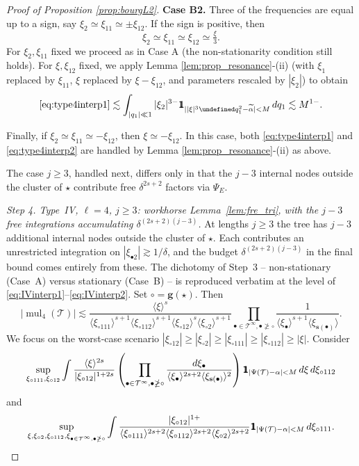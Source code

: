 \documentclass[a4paper,
11pt,  reqno]{amsart}
\newcommand{\mathbbm}[1]{\mathchoice%
    {\hbox{\sffamily 1\kern-.40em 1}}%
    {\hbox{\sffamily 1\kern-.40em 1}}%
    {\hbox{\scriptsize\sffamily 1\kern-.30em 1}}%
    {\hbox{\tiny\sffamily 1\kern-.25em 1}}}%
\newcommand{\jap}[1]{\langle #1 \rangle}
\newcommand{\5}{\textup{V}}
\newcommand{\noi}{\noindent}
\newcommand{\ind}{\mathbbm 1}
\theoremstyle{remark}
\newcommand{\bul}{\bullet}
\let\Re=\undefined\DeclareMathOperator*{\Re}{Re}
\newcommand{\TT}{\mathcal{T}}
\newcommand{\gb}{\mathbf{g}}
\newcommand{\sbf}{\mathbf{s}}
\DeclareMathOperator{\mul}{mul}
\numberwithin{equation}{section}
\numberwithin{theorem}{section}
\begin{document}
\begin{proof}[Proof of Proposition \ref{prop:bourgL2}]
\smallskip
\noi
\textbf{Case B2.} Three of the frequencies are equal up to a sign, say $\xi_2\simeq  \xi_{11} \simeq \pm \xi_{12}$. If the sign is positive, then
$$
\xi_2\simeq \xi_{11}\simeq \xi_{12} \simeq \tfrac{\xi}{3}.
$$
For $\xi_2, \xi_{11}$ fixed we proceed as in Case A (the non-stationarity condition still holds). For $\xi, \xi_{12}$ fixed, we apply Lemma \ref{lem:prop_resonance}-(ii) (with $\xi_1$ replaced by $\xi_{11}$, $\xi$ replaced by $\xi-\xi_{12}$, and parameters rescaled by $|\xi_2|$) to obtain
\begin{align}
\eqref{eq:type4interp1}\lesssim \int_{|q_1|\ll 1} |\xi_2|^{3-}\ind_{||\xi|^3\Re q_1^2 - \widetilde\alpha|<M} \,dq_1 \lesssim M^{1-}.
\end{align}

Finally, if $\xi_2\simeq \xi_{11}\simeq-\xi_{12}$, then $\xi\simeq -\xi_{12}$. In this case, both \eqref{eq:type4interp1} and \eqref{eq:type4interp2} are handled by Lemma \ref{lem:prop_resonance}-(ii) as above.

The case $j\ge 3$, handled next, differs only in that the $j-3$ internal nodes outside the cluster of $\star$ contribute free $\delta^{2s+2}$ factors via $\Psi_E$.

\medskip

\noi \textit{Step 4. Type~IV, $\ell=4$, $j\ge 3$: workhorse Lemma~\ref{lem:fre_tri}, with the $j-3$ free integrations accumulating $\delta^{(2s+2)(j-3)}$.}
At lengths $j\ge 3$ the tree has $j-3$ additional internal nodes outside the cluster of $\star$. Each contributes an unrestricted integration on $|\xi_{\bul 2}|\gtrsim 1/\delta$, and the budget $\delta^{(2s+2)(j-3)}$ in the final bound comes entirely from these. The dichotomy of Step~3 -- non-stationary (Case~A) versus stationary (Case~B) -- is reproduced verbatim at the level of \eqref{eq:IVinterp1}--\eqref{eq:IVinterp2}.
Set $\circ=\gb(\star)$. Then
\begin{equation}\label{eq:typeIVmult}
|\mul_4(\TT)|\lesssim \frac{\jap{\xi}^{s}}{\jap{\xi_{\circ111}}^{s+1}\jap{\xi_{\circ112}}^{s+1}\jap{\xi_{\circ12}}^{s}\jap{\xi_{\circ2}}^{s+1}} \prod_{\bul\in\TT^\infty, \bul\ngeq\circ} \frac{1}{\jap{\xi_\bul}^{s+1}\jap{\xi_{\sbf(\bul)}}}.
\end{equation}
We focus on the worst-case scenario $|\xi_{\circ12}|\ge |\xi_{\circ 2}|\ge |\xi_{\circ 111}| \ge |\xi_{\circ 112}| \ge |\xi|$. Consider
\begin{equation}\label{eq:IVinterp1}
\sup_{\xi_{\circ111}, \xi_{\circ12}}\int \frac{\jap{\xi}^{2s}}{|\xi_{\circ12}|^{1+2s}}\left(\prod_{\bul\in\TT^\infty, \bul\ngeq\circ} \frac{d\xi_\bul}{\jap{\xi_\bul}^{2s+2}\jap{\xi_{\sbf(\bul)}}^2}\right) \ind_{|\Psi(\TT)-\alpha|<M}\,d\xi\, d\xi_{\circ112}
\end{equation}
and
\begin{equation}\label{eq:IVinterp2}
\sup_{\xi, \xi_{\circ2}, \xi_{\circ112}, \xi_{\bul\in\TT^\infty, \bul\ngeq\circ}}\int \frac{|\xi_{\circ12}|^{1+}}{\jap{\xi_{\circ111}}^{2s+2}\jap{\xi_{\circ112}}^{2s+2}\jap{\xi_{\circ2}}^{2s+2}}\ind_{|\Psi(\TT)-\alpha|<M} \,d\xi_{\circ111}.
\end{equation}


\end{proof}
\end{document}
